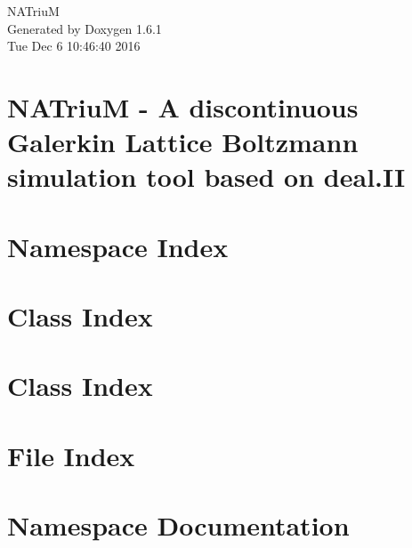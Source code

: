 \documentclass[a4paper]{book}
\begin{document}
\hypersetup{pageanchor=false}
\begin{titlepage}
\vspace*{7cm}
\begin{center}
{\Large NATriuM }\\
\vspace*{1cm}
{\large Generated by Doxygen 1.6.1}\\
\vspace*{0.5cm}
{\small Tue Dec 6 10:46:40 2016}\\
\end{center}
\end{titlepage}
\clearemptydoublepage
{}
\tableofcontents
\clearemptydoublepage
{}
\hypersetup{pageanchor=true}
\chapter{NATriuM -\/ A discontinuous Galerkin Lattice Boltzmann simulation tool based on deal.II}
\label{index}\hypertarget{index}{}
\chapter{Namespace Index}

\chapter{Class Index}

\chapter{Class Index}

\chapter{File Index}

\chapter{Namespace Documentation}




\end{document}
